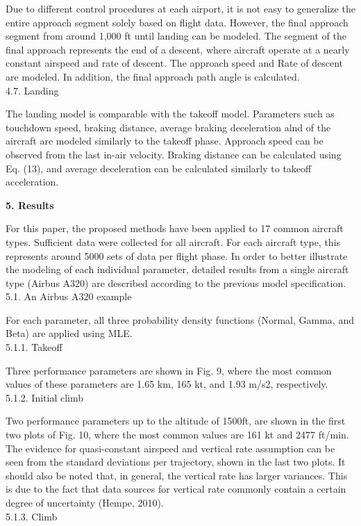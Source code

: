 \documentclass[a4paper,punct,space,heading=true,AutoFakeBold]{ctexrep}
\begin{document}
Due to different control procedures at each airport, it is not easy to generalize the entire approach segment solely based on flight data. However, the final approach segment from around 1,000 ft until landing can be modeled.
The segment of the final approach represents the end of a descent, where aircraft operate at a nearly constant airspeed and rate of descent. The approach speed and Rate of descent are modeled. In addition, the final approach path angle is calculated.\\
4.7. Landing

The landing model is comparable with the takeoff model. Parameters such as touchdown speed, braking distance, average braking deceleration alnd of the aircraft are modeled similarly to the takeoff phase. Approach speed can be observed from the last in-air velocity. Braking distance can be calculated using Eq. (13), and average deceleration can be calculated similarly to takeoff acceleration.

{
	\noindent\bfseries{5. Results}
}

For this paper, the proposed methods have been applied to 17 common aircraft types. Sufficient data were collected for all aircraft. For each aircraft type, this represents around 5000 sets of data per flight phase. In order to better illustrate the modeling of each individual parameter, detailed results from a single aircraft type (Airbus A320) are described according to the previous model specification.\\
5.1. An Airbus A320 example

For each parameter, all three probability density functions (Normal, Gamma, and Beta) are applied using MLE.\\
5.1.1. Takeoff

Three performance parameters are shown in Fig. 9, where the most common values of these parameters are 1.65 km, 165 kt, and 1.93 m/s2, respectively.\\
5.1.2. Initial climb

Two performance parameters up to the altitude of 1500ft, are shown in the first two plots of Fig. 10, where the most common values are 161 kt and 2477 ft/min.
The evidence for quasi-constant airspeed and vertical rate assumption can be seen from the standard deviations per trajectory, shown in the last two plots. It should also be noted that, in general, the vertical rate has larger variances. This is due to the fact that data sources for vertical rate commonly contain a certain degree of uncertainty (Hempe, 2010).\\
5.1.3. Climb
\end{document}
